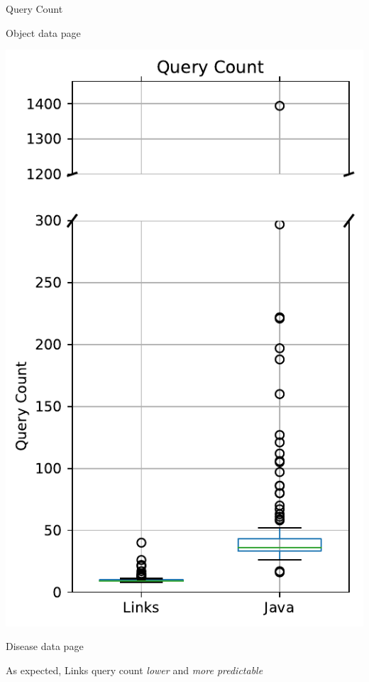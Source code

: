 \documentclass[11.5pt, aspectratio=169]{beamer}
\begin{document}
\begin{frame}{Query Count}
\begin{minipage}{0.28\textwidth}
    \begin{center}
      Object data page
    \end{center}
  \end{minipage}
  \hfill
  \begin{minipage}{0.28\textwidth}
    \centering
    \includegraphics[scale=0.4]{images/diseasedisplay_querycount_box.pdf}

    \begin{center}
      Disease data page
    \end{center}
  \end{minipage}
  \hfill
  \begin{minipage}{0.375\textwidth}
    \raggedright
    As expected, Links query count \emph{lower} and \emph{more predictable}
  \end{minipage}
\end{frame}
\end{document}

